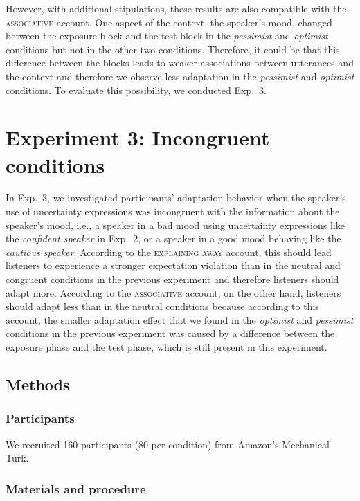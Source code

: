 However, with additional stipulations, these results are also compatible with the \textsc{associative} account. One aspect of the context, the speaker's mood, changed between the exposure block and the test block in the \textit{pessimist} and \textit{optimist} conditions but not in the other two conditions. Therefore, it could be that this difference between the blocks leads to weaker associations between utterances and the context and therefore we observe less adaptation in the \textit{pessimist} and \textit{optimist} conditions. To evaluate this possibility, we conducted Exp.~3.


\section{Experiment 3: Incongruent conditions}

In Exp.~3, we investigated participants' adaptation behavior when the speaker's use of uncertainty expressions was incongruent with the information about the speaker's mood, i.e., a speaker in a bad mood using uncertainty expressions like the \textit{confident speaker} in Exp.~2, or a speaker in a good mood behaving like the \textit{cautious speaker}. According to the \textsc{explaining away} account, this should lead listeners to experience a stronger expectation violation than in the neutral and congruent conditions in the previous experiment and therefore listeners should adapt more.  According to the \textsc{associative} account, on the other hand, listeners should adapt less than in the neutral conditions because according to this account, the smaller adaptation effect that we found in the \textit{optimist} and \textit{pessimist} conditions in the previous experiment was caused by a difference between the exposure phase and the test phase, which is still present in this experiment.


\subsection{Methods}

\subsubsection{Participants} We recruited 160 participants (80 per condition) from Amazon's Mechanical Turk.

\subsubsection{Materials and procedure}

